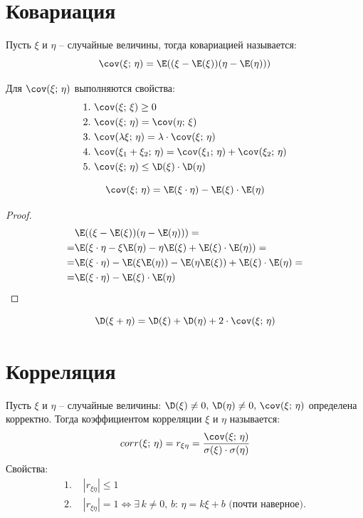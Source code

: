 \documentclass[12pt]{article}
\begin{document}
\section{Ковариация}

\begin{definition}
    Пусть $\xi$ и $\eta$ -- случайные величины, тогда ковариацией называется:
    $$\cov(\xi;\,\eta)=\E((\xi-\E(\xi))(\eta-\E(\eta)))$$
\end{definition}
\begin{theorem}
    Для $\cov(\xi;\,\eta)$ выполняются свойства:
    \begin{align*}
        1.\,\,&\cov(\xi;\,\xi)\geq0\\
        2.\,\,&\cov(\xi;\,\eta)=\cov(\eta;\,\xi)\\
        3.\,\,&\cov(\lambda \xi;\,\eta)=\lambda\cdot \cov(\xi;\,\eta)\\
        4.\,\,&\cov(\xi_1+\xi_2;\,\eta)=\cov(\xi_1;\,\eta)+\cov(\xi_2;\,\eta)\\
        5.\,\,&\cov(\xi;\,\eta)\leq \D(\xi)\cdot\D(\eta)
    \end{align*}
\end{theorem}
\begin{theorem}
    $$\cov(\xi;\,\eta)=\E(\xi\cdot\eta)-\E(\xi)\cdot\E(\eta)$$
\end{theorem}
\begin{proof}
    \begin{align*}
        &\E((\xi-\E(\xi))(\eta-\E(\eta)))=\\
        =&\E(\xi\cdot\eta-\xi\E(\eta)-\eta\E(\xi)+\E(\xi)\cdot\E(\eta))=\\
        =&\E(\xi\cdot\eta)-\E(\xi\E(\eta))-\E(\eta\E(\xi))+\E(\xi)\cdot\E(\eta)=\\
        =&\E(\xi\cdot\eta)-\E(\xi)\cdot\E(\eta)
    \end{align*}
\end{proof}
\begin{theorem}
    $$\D(\xi+\eta)=\D(\xi)+\D(\eta)+2\cdot \cov(\xi;\,\eta)$$
\end{theorem}
\section{Корреляция}

\begin{definition}
    Пусть $\xi$ и $\eta$ -- случайные величины: $\D(\xi)\neq0,\,\D(\eta)\neq0,\,\cov(\xi;\,\eta)$ определена корректно. Тогда коэффициентом корреляции $\xi$ и $\eta$ называется:
    $$corr(\xi;\,\eta)=r_{\xi\eta}=\frac{\cov(\xi;\,\eta)}{\sigma(\xi)\cdot\sigma(\eta)}$$
    Свойства:
    \begin{align*}
        1.\,\,&|r_{\xi\eta}|\leq 1\\
        2.\,\,&|r_{\xi\eta}|=1\Longleftrightarrow \exists\, k\neq 0,\,b:\,\eta=k\xi+b\text{ (почти наверное).}
    \end{align*}
\end{definition}
\end{document}
